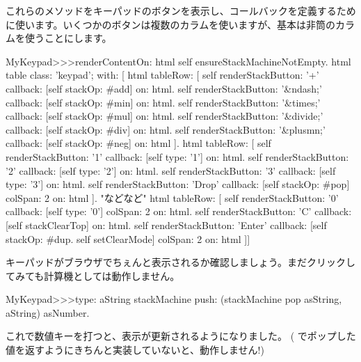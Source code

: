 \documentclass[a4paper,10pt,twoside]{book}
\begin{document}
これらのメソッドをキーパッドのボタンを表示し、コールバックを定義するために使います。いくつかのボタンは複数のカラムを使いますが、基本は非筒のカラムを使うことにします。


\begin{code}{}
MyKeypad>>>renderContentOn: html 
  self ensureStackMachineNotEmpty.
  html table
    class: 'keypad';
    with: [
      html tableRow: [
          self renderStackButton: '+' callback: [self stackOp: #add] on: html.
          self renderStackButton: '&ndash;' callback: [self stackOp: #min] on: html.
          self renderStackButton: '&times;' callback: [self stackOp: #mul] on: html.
          self renderStackButton: '&divide;' callback: [self stackOp: #div] on: html.
          self renderStackButton: '&plusmn;' callback: [self stackOp: #neg] on: html ].
        html tableRow: [
          self renderStackButton: '1' callback: [self type: '1'] on: html.
          self renderStackButton: '2' callback: [self type: '2'] on: html.
          self renderStackButton: '3' callback: [self type: '3'] on: html.
          self renderStackButton: 'Drop' callback: [self stackOp: #pop]
          	colSpan: 2 on: html ].
"などなど"
        html tableRow: [
          self renderStackButton: '0' callback: [self type: '0'] colSpan: 2 on: html.
          self renderStackButton: 'C' callback: [self stackClearTop] on: html.
          self renderStackButton: 'Enter'
          	callback: [self stackOp: #dup. self setClearMode]
			colSpan: 2 on: html ]]
\end{code}

キーパッドがブラウザでちぇんと表示されるか確認しましょう。まだクリックしてみても計算機としては動作しません。


\begin{code}{}
MyKeypad>>>type: aString
	stackMachine push: (stackMachine pop asString, aString) asNumber.
\end{code}
これで数値キーを打つと、表示が更新されるようになりました。
( でポップした値を返すようにきちんと実装していないと、動作しません!)
\end{document}
